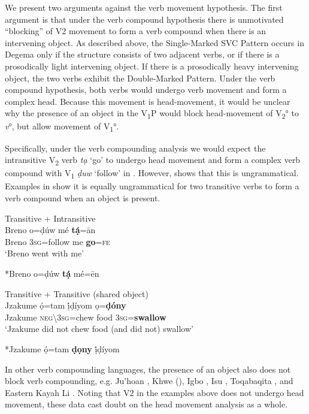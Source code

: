 \documentclass[output=paper]{langsci/langscibook}
\begin{document}
We present two arguments against the verb movement hypothesis. The first argument is that under the verb compound hypothesis there is unmotivated “blocking” of V2 movement to form a verb compound when there is an intervening object. As described above, the Single-Marked SVC Pattern occurs in Degema only if the structure consists of two adjacent verbs, or if there is a prosodically light intervening object. If there is a prosodically heavy intervening object, the two verbs exhibit the Double-Marked Pattern. Under the verb compound hypothesis, both verbs would undergo verb movement and form a complex head. Because this movement is head-movement, it would be unclear why the presence of an object in the V\textsubscript{1}P would block head-movement of V\textsubscript{2}° to \textit{v}°, but allow movement of V\textsubscript{1}°.

Specifically, under the verb compounding analysis we would expect the intransitive V\textsubscript{2} verb \textit{tạ} ‘go’ to undergo head movement and form a complex verb compound with V\textsubscript{1} \textit{ḍuw} ‘follow’ in . However,  shows that this is ungrammatical. Examples in  show it is equally ungrammatical for two transitive verbs to form a verb compound when an object is present. 

\ea\label{ex:rolle:tran}
{Transitive + Intransitive}\\
\ea\label{ex:rolle:37}
\gll   Breno   o=ḍúw    mé   \textbf{tạ́}=ān\\
     Breno   3\textsc{sg}=follow   me   \textbf{go}=\textsc{fe}\\
\glt ‘Breno went with me’ \citep[115]{Kari2004}

\ex\label{ex:rolle:38}
  *Breno o=ḍúw  \textbf{tạ́}  mé=ēn\\
\z
\z 

\ea\label{ex:rolle:so}
{Transitive + Transitive (shared object)}\\
   \ea\label{ex:rolle:39}
\gll   Jzakume   ọ́=tam      ị́ḍíyom  ọ=\textbf{ḍóny}\\
     Jzakume  \textsc{neg{\textbackslash}}3\textsc{sg}=chew  food  3\textsc{sg}=\textbf{swallow}\\
\glt ‘Jzakume did not chew food (and did not) swallow’ \citep[110]{Kari2004}

\ex\label{ex:rolle:40}
   *Jzakume  ọ́=tam  \textbf{ḍọny}  ị́ḍíyom\\
\z
\z 


In other verb compounding languages, the presence of an object also does not block verb compounding, e.g. Ju{\textbar}’hoan \citep{Collins2002}, Khwe (\citealt{KilianHatz2006}), Igbo \citep{Lord1975}, Isu \citep{Kießling2011}, Toqabaqita \citep{Lichtenberk2006,Lichtenberk2008}, and Eastern Kayah Li \citep{Solnit2006}. Noting that V2 in the examples above does not undergo head movement, these data cast doubt on the head movement analysis as a whole.
\end{document}
